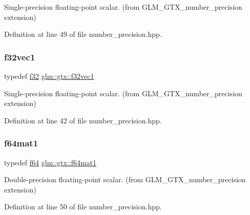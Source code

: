 Single-\/precision floating-\/point scalar. (from G\+L\+M\+\_\+\+G\+T\+X\+\_\+number\+\_\+precision extension) 



Definition at line 49 of file number\+\_\+precision.\+hpp.

\mbox{\label{group__gtx__number__precision_gadab8e598b0b4697629482682bdb7f223}} 
\subsubsection{\texorpdfstring{f32vec1}{f32vec1}}
{\footnotesize\ttfamily typedef \mbox{\hyperlink{group__gtc__type__precision_ga0ec999b57f5330d9021256e96038df04}{f32}} \mbox{\hyperlink{group__gtx__number__precision_gadab8e598b0b4697629482682bdb7f223}{glm\+::gtx\+::f32vec1}}}



Single-\/precision floating-\/point scalar. (from G\+L\+M\+\_\+\+G\+T\+X\+\_\+number\+\_\+precision extension) 



Definition at line 42 of file number\+\_\+precision.\+hpp.

\mbox{\label{group__gtx__number__precision_ga23f8f53c78b50aa07a113c3d07d01bc9}} 
\subsubsection{\texorpdfstring{f64mat1}{f64mat1}}
{\footnotesize\ttfamily typedef \mbox{\hyperlink{group__gtc__type__precision_ga2bba392e555124b36cde6abba349bab3}{f64}} \mbox{\hyperlink{group__gtx__number__precision_ga23f8f53c78b50aa07a113c3d07d01bc9}{glm\+::gtx\+::f64mat1}}}



Double-\/precision floating-\/point scalar. (from G\+L\+M\+\_\+\+G\+T\+X\+\_\+number\+\_\+precision extension) 



Definition at line 50 of file number\+\_\+precision.\+hpp.

\mbox{\label{group__gtx__number__precision_ga710a5952d78b22635c71c5fc2c0a3319}} 
